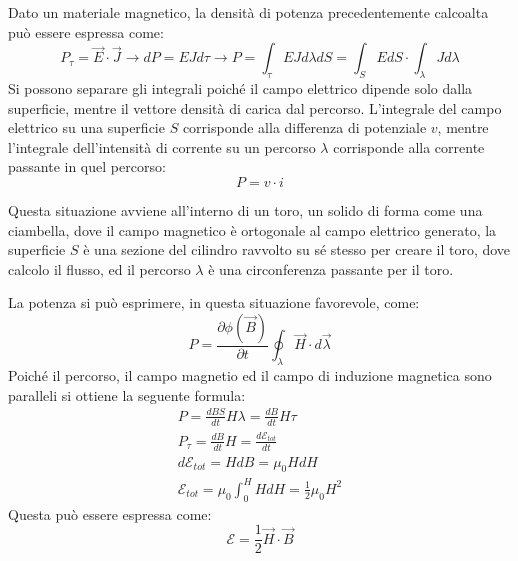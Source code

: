 \documentclass{article}
\numberwithin{equation}{subsection}
\begin{document}
Dato un materiale magnetico, la densità di potenza precedentemente calcoalta può essere espressa come:
\begin{equation*}
    P_\tau=\vec{E}\cdot\vec{J}\to dP=EJd\tau\to P=\displaystyle\int_{\tau}EJd\lambda dS=\int_{S}EdS\cdot\int_{\lambda}Jd\lambda
\end{equation*}
Si possono separare gli integrali poiché il campo elettrico dipende solo dalla superficie, mentre il vettore densità di carica dal percorso. L'integrale del campo elettrico 
su una superficie $S$ corrisponde alla differenza di potenziale $v$, mentre l'integrale dell'intensità di corrente su un percorso $\lambda$ corrisponde alla corrente passante 
in quel percorso: 
\begin{equation}
    P=v\cdot i
\end{equation}

Questa situazione avviene all'interno di un toro, un solido di forma come una ciambella, dove il campo magnetico è ortogonale al campo elettrico generato, la superficie $S$ 
è una sezione del cilindro ravvolto su sé stesso per creare il toro, dove calcolo il flusso, ed il percorso $\lambda$ è una circonferenza passante per il toro. 

La potenza si può esprimere, in questa situazione favorevole, come:
\begin{equation*}
    P=\displaystyle\frac{\partial \phi(\vec{B})}{\partial t}\oint_{\lambda}\vec{H}\cdot d\vec{\lambda}
\end{equation*}
Poiché il percorso, il campo magnetio ed il campo di induzione magnetica sono paralleli si ottiene la seguente formula:
\begin{gather*}
    P=\displaystyle\frac{dBS}{dt}H\lambda=\frac{dB}{dt}H\tau\\
    P_{\tau}=\displaystyle\frac{dB}{dt}H=\frac{d\mathscr{E}_{tot}}{dt}\\
    d\mathscr{E}_{tot}=HdB=\mu_0HdH\\
    \mathscr{E}_{tot}=\displaystyle\mu_0\int_0^HHdH=\frac{1}{2}\mu_0H^2
\end{gather*}
Questa può essere espressa come:
\begin{equation}
    \mathscr{E}=\displaystyle\frac{1}{2}\vec{H}\cdot\vec{B}
\end{equation}
\end{document}
